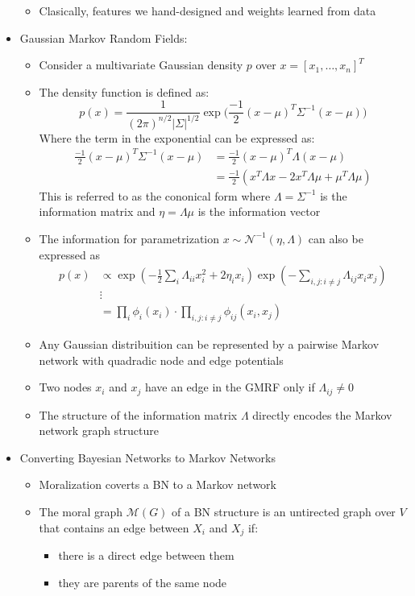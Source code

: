 \documentclass{article}
\begin{document}
\begin{itemize}
\begin{itemize}
        \item Clasically, features we hand-designed and weights learned from data 
    \end{itemize}
    \item Gaussian Markov Random Fields: \begin{itemize}
        \item Consider a multivariate Gaussian density $p$ over $x = [x_1, \dots , x_n]^T$
        \item The density function is defined as: \begin{equation*}
            p(x) = \frac{1}{(2\pi)^{n/2}|\Sigma|^{1/2}}\exp \bigg(\frac{-1}{2}(x - \mu)^T \Sigma^{-1}(x - \mu)\bigg)
        \end{equation*}
        Where the term in the exponential can be expressed as: \begin{align*}
            \frac{-1}{2}(x - \mu)^T \Sigma^{-1}(x - \mu) &= \frac{-1}{2}(x - \mu)^T \Lambda (x - \mu)\\
            &= \frac{-1}{2}(x^T \Lambda x - 2x^T \Lambda \mu + \mu^T \Lambda \mu)
        \end{align*}
        This is referred to as the cononical form where $\Lambda = \Sigma^{-1}$ is the information matrix and $\eta = \Lambda\mu$ is the information vector 
        \item The information for parametrization $x \sim \mathcal{N}^{-1}(\eta, \Lambda)$ can also be expressed as \begin{align*}
            p(x) &\propto \exp (-\frac{1}{2}\sum_{i}\Lambda_{ii}x_i^2 + 2\eta_i x_i) \exp(-\sum_{i, j : i \neq j }\Lambda_{ij}x_ix_j) \\
            &\vdots \\
            &= \prod_i \phi_i(x_i) \cdot \prod_{i,j:i\neq j} \phi_{ij}(x_i, x_j)
        \end{align*}
        \item Any Gaussian distribuition can be represented by a pairwise Markov network with quadradic node and edge potentials 
        \item Two nodes $x_i$ and $x_j$ have an edge in the GMRF only if $\Lambda_{ij} \neq 0$
        \item The structure of the information matrix $\Lambda$ directly encodes the Markov network graph structure 
    \end{itemize}
    \item Converting Bayesian Networks to Markov Networks \begin{itemize}
        \item Moralization coverts a BN to a Markov network 
        \item The moral graph $\mathcal{M}(G)$ of a BN structure is an untirected graph over $V$ that contains an edge between $X_i$ and $X_j$ if:\begin{itemize}
            \item there is a direct edge between them 
            \item they are parents of the same node 
        \end{itemize}
    \end{itemize}
\end{itemize}
\end{document}
